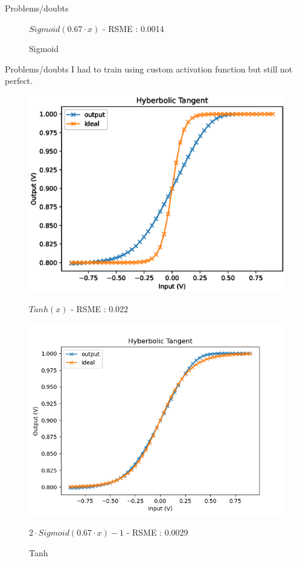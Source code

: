 \documentclass[table]{beamer}
\begin{document}
\begin{frame}{Problems/doubts}
\begin{figure}[!tbp]
\begin{minipage}[b]{0.4\textwidth}
        \caption{ $ Sigmoid(0.67\cdot x) $ - RSME : 0.0014}
      \end{minipage}
      \caption{Sigmoid}
    \end{figure}
  \end{frame}

  \begin{frame}{Problems/doubts}
    I had to train using custom activation function but still not perfect.
    \begin{figure}[!tbp]
      \centering
      \begin{minipage}[b]{0.4\textwidth}
        \centering
        \includegraphics[width=\textwidth]{activation/tanh}
        \caption{ $ Tanh(x) $ - RSME : 0.022}
      \end{minipage}
      \hspace{20pt}
      \begin{minipage}[b]{0.4\textwidth}
        \centering
        \includegraphics[width=\textwidth]{activation/cTanh}
        \caption{ $2\cdot Sigmoid(0.67\cdot x)-1$ - RSME : 0.0029}
      \end{minipage}
      \caption{Tanh}
    \end{figure}
  \end{frame}
\end{document}
